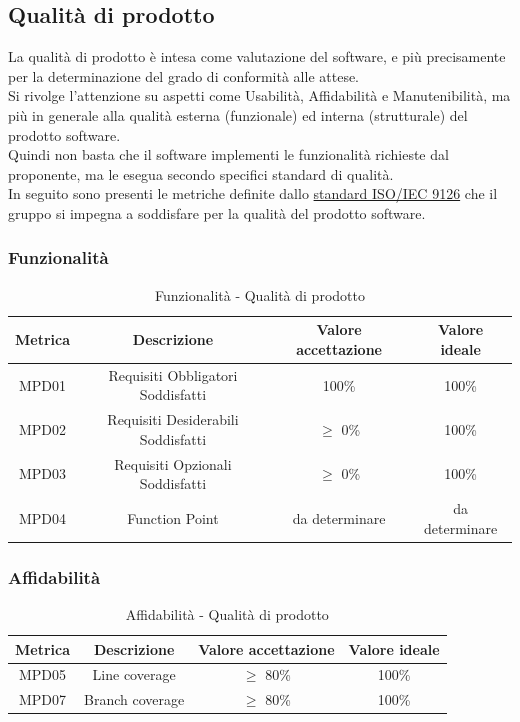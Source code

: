 \documentclass[10pt]{article}
\begin{document}
\begin{justify}
\subsection{Qualità di prodotto}
La qualità di prodotto è intesa come valutazione del software, e più precisamente per la determinazione del grado di conformità alle attese.\\
Si rivolge l'attenzione su aspetti come Usabilità, Affidabilità e Manutenibilità, ma più in generale alla qualità esterna (funzionale) ed interna (strutturale) del prodotto software.\\
Quindi non basta che il software implementi le funzionalità richieste dal proponente, ma le esegua secondo specifici standard di qualità.\\
In seguito sono presenti le metriche definite dallo \hyperref[ISO 9126]{standard ISO/IEC 9126} che il gruppo si impegna a soddisfare per la qualità del prodotto software.
\subsubsection{Funzionalità}
\begin{table}[H]
  \centering
\begin{tabular}{|c|c|c|c|}
  \hline
  \textbf{Metrica} & \textbf{Descrizione} & \textbf{Valore accettazione} & \textbf{Valore ideale}\\
  \hline
  MPD01 & Requisiti Obbligatori Soddisfatti & 100\% & 100\%\\
  \hline
  MPD02 & Requisiti Desiderabili Soddisfatti  & $\geq$ 0\% & 100\% \\
  \hline
  MPD03 & Requisiti Opzionali Soddisfatti & $\geq$ 0\% & 100\% \\
  \hline
  MPD04 & Function Point & da determinare & da determinare \\ 
  \hline
\end{tabular}
\caption{Funzionalità - Qualità di prodotto}
\label{tab:funzionalità}
\end{table}

\subsubsection{Affidabilità}
\begin{table}[H]
  \centering
\begin{tabular}{|c|c|c|c|}
  \hline
  \textbf{Metrica} & \textbf{Descrizione} & \textbf{Valore accettazione} & \textbf{Valore ideale}\\
  \hline
  MPD05 & Line coverage & $\geq$ 80\% & 100\% \\
  \hline
  MPD07 & Branch coverage & $\geq$ 80\% & 100\% \\
  \hline
\end{tabular}
\caption{Affidabilità - Qualità di prodotto}
\label{tab:affidabilità}
\end{table}


\end{justify}
\end{document}

